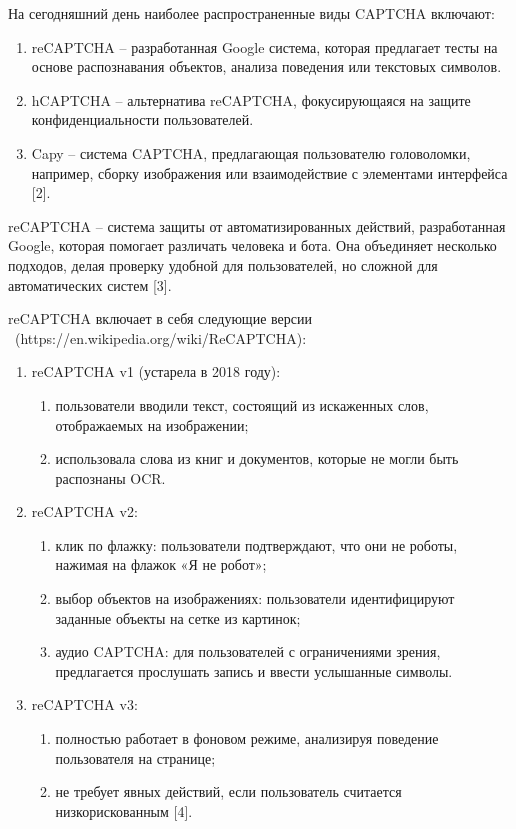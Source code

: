 На сегодняшний день наиболее распространенные виды CAPTCHA включают:

\begin{enumerate}
    \item reCAPTCHA -- разработанная Google система, которая предлагает тесты 
    на основе распознавания объектов, анализа поведения или текстовых символов.
    \item hCAPTCHA -- альтернатива reCAPTCHA, фокусирующаяся на защите 
    конфиденциальности пользователей.
    \item Capy -- система CAPTCHA, предлагающая пользователю головоломки, 
    например, сборку изображения или взаимодействие с элементами интерфейса [2].
\end{enumerate}

reCAPTCHA -- система защиты от автоматизированных действий, разработанная Google, 
которая помогает различать человека и бота. Она объединяет несколько подходов, 
делая проверку удобной для пользователей, но сложной для автоматических систем 
[3].

reCAPTCHA включает в себя следующие версии
~(https://en.wikipedia.org/wiki/ReCAPTCHA):

\begin{enumerate}
    \item reCAPTCHA v1 (устарела в 2018 году):
    \begin{enumerate}
        \item пользователи вводили текст, состоящий из искаженных слов, 
        отображаемых на изображении;
        \item использовала слова из книг и документов, которые не могли быть 
        распознаны OCR.
    \end{enumerate}
    \item reCAPTCHA v2:
    \begin{enumerate}
        \item клик по флажку: пользователи подтверждают, что они не роботы, 
        нажимая на флажок «Я не робот»;
        \item выбор объектов на изображениях: пользователи идентифицируют 
        заданные объекты на сетке из картинок;
        \item аудио CAPTCHA: для пользователей с ограничениями зрения, 
        предлагается прослушать запись и ввести услышанные символы.
    \end{enumerate}
    \item reCAPTCHA v3:
    \begin{enumerate}
        \item полностью работает в фоновом режиме, анализируя поведение 
        пользователя на странице;
        \item не требует явных действий, если пользователь считается 
        низкорискованным [4].
    \end{enumerate}
\end{enumerate}

